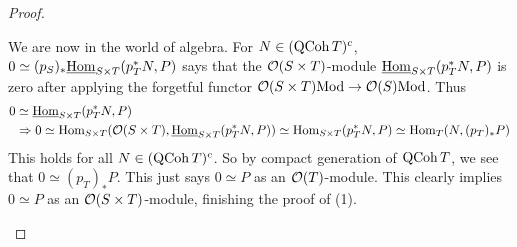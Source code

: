 \documentclass[./main.tex]{subfiles}
\begin{document}
\begin{proof}
\begin{lem}
\begin{proof1}
      We are now in the world of algebra.
      For $N \in (\mathrm{QCoh}\,T)^c$,
      $0 \simeq (p_S)_*\underline{\mathrm{Hom}}_{S \times T}(p_T^* N , P)$ says
      that the $\mathcal{O}(S \times T)$-module 
      $\underline{\mathrm{Hom}}_{S \times T}(p_T^* N , P)$ is zero
      after applying the forgetful functor $\mathcal{O}(S\times T)\mathrm{Mod} \to \mathcal{O}(S)\mathrm{Mod}$.
      Thus \begin{align*}
        0 &\simeq \underline{\mathrm{Hom}}_{S \times T}(p_T^* N , P) \\
        &\Rightarrow
        0 \simeq \mathrm{Hom}_{S \times T}(\mathcal{O}(S \times T) , 
          \underline{\mathrm{Hom}}_{S \times T}(p_T^* N , P))
          \simeq \mathrm{Hom}_{S \times T}(p_T^*N , P)
          \simeq \mathrm{Hom}_{T}(N , (p_T)_* P)
      \end{align*}
      This holds for all $N \in (\mathrm{QCoh}\,T)^c$.
      So by compact generation of $\mathrm{QCoh}\,T$,
      we see that $0 \simeq (p_T)_* P$.
      This just says $0 \simeq P$ as an $\mathcal{O}(T)$-module.
      This clearly implies $0 \simeq P$ as an $\mathcal{O}(S \times T)$-module,
      finishing the proof of (1).
      

\end{proof1}
\end{lem}
\end{proof}
\end{document}
